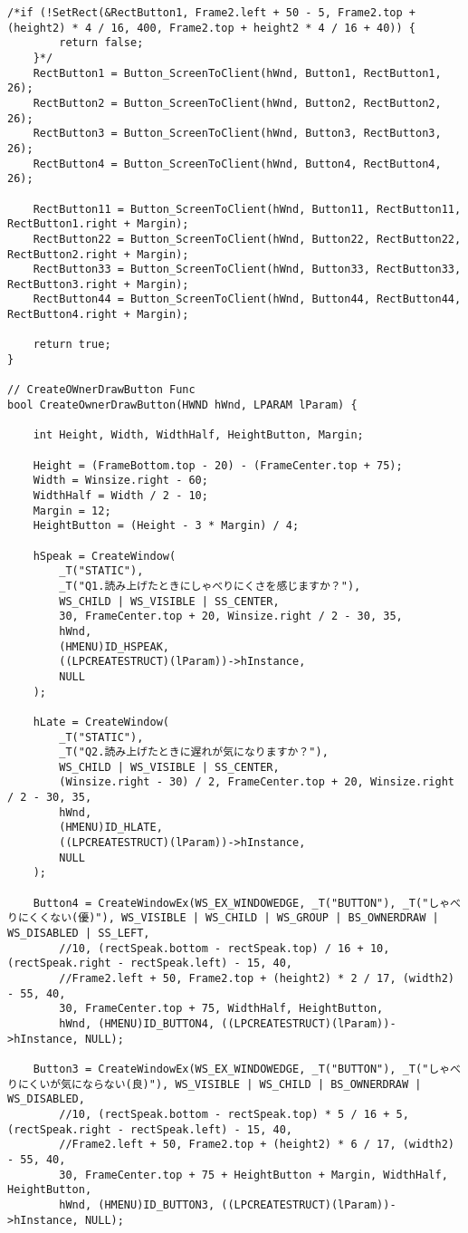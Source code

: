 \begin{lstlisting}[caption=window.cpp]
	/*if (!SetRect(&RectButton1, Frame2.left + 50 - 5, Frame2.top + (height2) * 4 / 16, 400, Frame2.top + height2 * 4 / 16 + 40)) {
		return false;
	}*/
	RectButton1 = Button_ScreenToClient(hWnd, Button1, RectButton1, 26);
	RectButton2 = Button_ScreenToClient(hWnd, Button2, RectButton2, 26);
	RectButton3 = Button_ScreenToClient(hWnd, Button3, RectButton3, 26);
	RectButton4 = Button_ScreenToClient(hWnd, Button4, RectButton4, 26);

    RectButton11 = Button_ScreenToClient(hWnd, Button11, RectButton11, RectButton1.right + Margin);
    RectButton22 = Button_ScreenToClient(hWnd, Button22, RectButton22, RectButton2.right + Margin);
    RectButton33 = Button_ScreenToClient(hWnd, Button33, RectButton33, RectButton3.right + Margin);
    RectButton44 = Button_ScreenToClient(hWnd, Button44, RectButton44, RectButton4.right + Margin);

	return true;
}

// CreateOWnerDrawButton Func
bool CreateOwnerDrawButton(HWND hWnd, LPARAM lParam) {

	int Height, Width, WidthHalf, HeightButton, Margin;

	Height = (FrameBottom.top - 20) - (FrameCenter.top + 75);
	Width = Winsize.right - 60;
	WidthHalf = Width / 2 - 10;
	Margin = 12;
	HeightButton = (Height - 3 * Margin) / 4;

	hSpeak = CreateWindow(
		_T("STATIC"),
		_T("Q1.読み上げたときにしゃべりにくさを感じますか？"),
		WS_CHILD | WS_VISIBLE | SS_CENTER,
		30, FrameCenter.top + 20, Winsize.right / 2 - 30, 35,
		hWnd,
		(HMENU)ID_HSPEAK,
		((LPCREATESTRUCT)(lParam))->hInstance,
		NULL
	);

	hLate = CreateWindow(
		_T("STATIC"),
		_T("Q2.読み上げたときに遅れが気になりますか？"),
		WS_CHILD | WS_VISIBLE | SS_CENTER,
		(Winsize.right - 30) / 2, FrameCenter.top + 20, Winsize.right / 2 - 30, 35,
		hWnd,
		(HMENU)ID_HLATE,
		((LPCREATESTRUCT)(lParam))->hInstance,
		NULL
	);

	Button4 = CreateWindowEx(WS_EX_WINDOWEDGE, _T("BUTTON"), _T("しゃべりにくくない(優)"), WS_VISIBLE | WS_CHILD | WS_GROUP | BS_OWNERDRAW | WS_DISABLED | SS_LEFT,
		//10, (rectSpeak.bottom - rectSpeak.top) / 16 + 10, (rectSpeak.right - rectSpeak.left) - 15, 40,
		//Frame2.left + 50, Frame2.top + (height2) * 2 / 17, (width2) - 55, 40,
		30, FrameCenter.top + 75, WidthHalf, HeightButton,
		hWnd, (HMENU)ID_BUTTON4, ((LPCREATESTRUCT)(lParam))->hInstance, NULL);

	Button3 = CreateWindowEx(WS_EX_WINDOWEDGE, _T("BUTTON"), _T("しゃべりにくいが気にならない(良)"), WS_VISIBLE | WS_CHILD | BS_OWNERDRAW | WS_DISABLED,
		//10, (rectSpeak.bottom - rectSpeak.top) * 5 / 16 + 5, (rectSpeak.right - rectSpeak.left) - 15, 40,
		//Frame2.left + 50, Frame2.top + (height2) * 6 / 17, (width2) - 55, 40,
		30, FrameCenter.top + 75 + HeightButton + Margin, WidthHalf, HeightButton,
		hWnd, (HMENU)ID_BUTTON3, ((LPCREATESTRUCT)(lParam))->hInstance, NULL);


\end{lstlisting}
